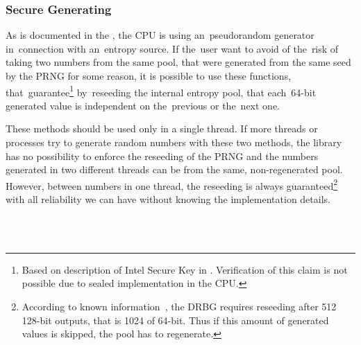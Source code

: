 \subsubsection{Secure Generating}\label{subsec:api:secure}
\par{
As is documented in the , the CPU is using an~pseudorandom generator in~connection with an~entropy source. If the~user want to avoid of the~risk of taking two numbers from the same pool, that were generated from the same seed by the PRNG for some reason, it is possible to use these functions, that~guarantee\footnote{Based on description of Intel Secure Key in . Verification of this claim is not possible due to sealed implementation in the CPU.} by~reseeding the internal entropy pool, that each~64-bit generated value is independent on the~previous or the~next one. 
}

\par{
These methods should be used only in a single thread. 
If more threads or processes try to generate random numbers with these two methods, 
the library has no possibility to enforce the reseeding of the PRNG and the numbers generated 
in two different threads can be from the same, non-regenerated pool.
However, between numbers in one thread, 
the reseeding is always guaranteed\footnote{According to known information~\cite[sec.~2.4.2]{AnalysisOfDRNG}, the DRBG requires reseeding after 512 128-bit outputs, that is 1024 of 64-bit. 
Thus if this amount of generated values is skipped, the pool has to regenerate.} 
with all reliability we can have without knowing the implementation details.
}



\\


\\


